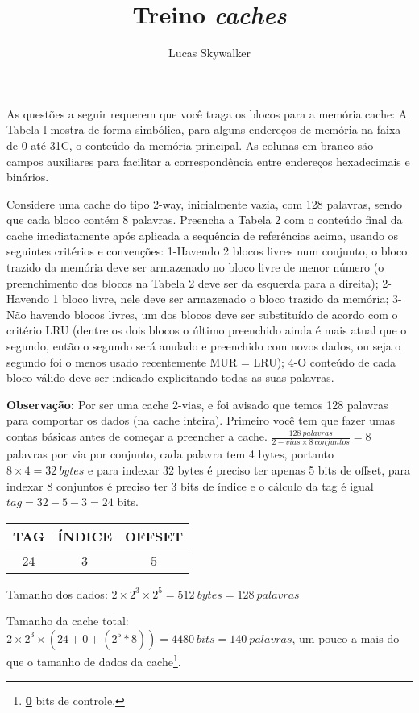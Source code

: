 \documentclass{article}
\author{Lucas Skywalker}
\title{Treino \textit{caches}}
\begin{document}
As questões a seguir requerem que você traga os blocos para a memória cache: A 
Tabela l mostra de forma simbólica, para alguns endereços de memória
na faixa de 0 até 31C, o conteúdo da memória principal. As colunas em branco
são campos auxiliares para facilitar a correspondência entre endereços
hexadecimais e binários.

Considere uma cache do tipo 2-way, inicialmente vazia, com 128 palavras, sendo
que cada bloco contém 8 palavras. Preencha a Tabela 2 com o conteúdo final da
cache imediatamente após aplicada a sequência de referências acima, usando os
seguintes critérios e convenções: 1-Havendo 2 blocos livres num conjunto, o
bloco trazido da memória deve ser armazenado no bloco livre de menor número (o
preenchimento dos blocos na Tabela 2 deve ser da esquerda para a direita);
2-Havendo 1 bloco livre, nele deve ser armazenado o bloco trazido da memória;
3-Não havendo blocos livres, um dos blocos deve ser substituído de acordo com o
critério LRU (dentre os dois blocos o último preenchido ainda é mais atual que o
segundo, então o segundo será anulado e preenchido com novos dados, ou seja o
segundo foi o menos usado recentemente MUR = LRU); 4-O conteúdo de cada bloco
válido deve ser indicado explicitando todas as suas palavras.


\textbf{Observação:} Por ser uma cache 2-vias, e foi avisado que temos 128
palavras para comportar os dados (na cache inteira). Primeiro você tem que fazer
umas contas básicas antes de começar a preencher a cache. $\frac{128\
palavras}{2-vias \times 8\ conjuntos} = 8$ palavras por via por conjunto, cada
palavra tem 4 bytes, portanto $8 \times 4 = 32\ bytes$ e para indexar 32 bytes 
é preciso ter apenas 5 bits de offset, para indexar 8 conjuntos é preciso ter 3 
bits de índice e o cálculo da tag é igual $tag = 32 - 5 - 3 = 24$ bits.

\begin{tabular}{|c|c|c|}
\hline TAG & ÍNDICE & OFFSET \\
\hline 24 & 3 & 5 \\
\hline
\end{tabular}

Tamanho dos dados: $2 \times 2^{3} \times 2^{5} = 512\ bytes = 128\ palavras$

Tamanho da cache total: $2 \times 2^{3} \times (24 + 0 + (2^{5} * 8)) = 4480\ 
bits = 140\ palavras$, um pouco a mais do que o tamanho de dados da 
cache\footnote{\textbf{\underline{0}} bits de controle.}.

\clearpage
\end{document}
